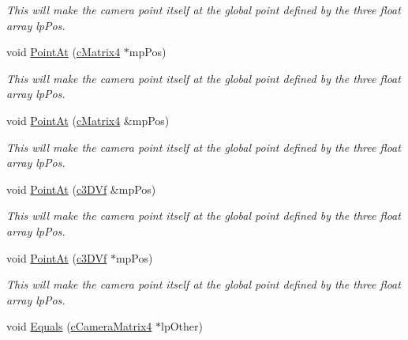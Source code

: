 \begin{DoxyCompactItemize}
\begin{DoxyCompactList}\small\item\em This will make the camera point itself at the global point defined by the three float array lpPos. \end{DoxyCompactList}\item 
\hypertarget{classc_camera_matrix4_af4d7a8a24ba247bbd035e22ef609981c}{
void \hyperlink{classc_camera_matrix4_af4d7a8a24ba247bbd035e22ef609981c}{PointAt} (\hyperlink{classc_matrix4}{cMatrix4} $\ast$mpPos)}
\label{classc_camera_matrix4_af4d7a8a24ba247bbd035e22ef609981c}

\begin{DoxyCompactList}\small\item\em This will make the camera point itself at the global point defined by the three float array lpPos. \end{DoxyCompactList}\item 
\hypertarget{classc_camera_matrix4_aa4cd6a1c22791a336c3eb21d0a0d94e4}{
void \hyperlink{classc_camera_matrix4_aa4cd6a1c22791a336c3eb21d0a0d94e4}{PointAt} (\hyperlink{classc_matrix4}{cMatrix4} \&mpPos)}
\label{classc_camera_matrix4_aa4cd6a1c22791a336c3eb21d0a0d94e4}

\begin{DoxyCompactList}\small\item\em This will make the camera point itself at the global point defined by the three float array lpPos. \end{DoxyCompactList}\item 
\hypertarget{classc_camera_matrix4_ac9e73a11692a91065a59af310e8e246b}{
void \hyperlink{classc_camera_matrix4_ac9e73a11692a91065a59af310e8e246b}{PointAt} (\hyperlink{classc3_d_vf}{c3DVf} \&mpPos)}
\label{classc_camera_matrix4_ac9e73a11692a91065a59af310e8e246b}

\begin{DoxyCompactList}\small\item\em This will make the camera point itself at the global point defined by the three float array lpPos. \end{DoxyCompactList}\item 
\hypertarget{classc_camera_matrix4_aee6a49404715d0a891f7e59c0124fc16}{
void \hyperlink{classc_camera_matrix4_aee6a49404715d0a891f7e59c0124fc16}{PointAt} (\hyperlink{classc3_d_vf}{c3DVf} $\ast$mpPos)}
\label{classc_camera_matrix4_aee6a49404715d0a891f7e59c0124fc16}

\begin{DoxyCompactList}\small\item\em This will make the camera point itself at the global point defined by the three float array lpPos. \end{DoxyCompactList}\item 
\hypertarget{classc_camera_matrix4_ac22d068fd30bfd2c5cb23dc06822f500}{
void \hyperlink{classc_camera_matrix4_ac22d068fd30bfd2c5cb23dc06822f500}{Equals} (\hyperlink{classc_camera_matrix4}{cCameraMatrix4} $\ast$lpOther)}
\label{classc_camera_matrix4_ac22d068fd30bfd2c5cb23dc06822f500}


\end{DoxyCompactItemize}
